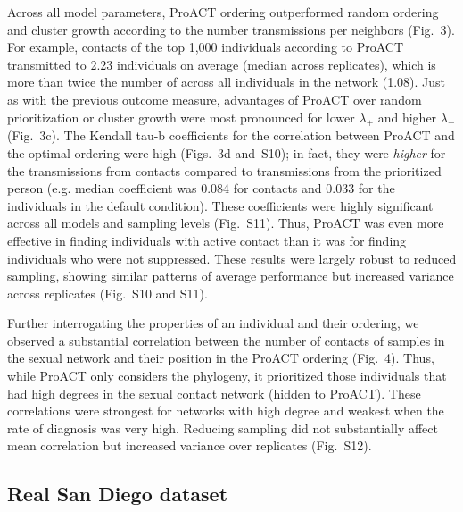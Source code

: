 \documentclass[a4paper,11pt]{article}
\newcommand{\PLWH}{sample\xspace}
\begin{document}
Across all model parameters, ProACT ordering outperformed random ordering and cluster growth according to the number transmissions per neighbors (Fig.~3).
For example, contacts of the top 1,000 individuals according to ProACT transmitted to 2.23 individuals on average (median across replicates), which is more than twice the number of across all individuals in the network (1.08).
Just as with the previous outcome measure, advantages of ProACT over random prioritization or cluster growth were most pronounced for lower $\lambda_{+}$ and higher $\lambda_{-}$ (Fig.~3c). 
The Kendall tau-b coefficients for the correlation between ProACT and the optimal ordering were high (Figs.~3d and~S10); in fact, they were \textit{higher} for the transmissions from contacts compared to transmissions from the prioritized person (e.g. median coefficient was 0.084 for contacts and 0.033 for the individuals in the default condition). 
These coefficients were highly significant across all models and sampling levels (Fig.~S11).
Thus, ProACT was even more effective in finding individuals with active contact than it was for finding individuals who were not suppressed. 
These results were largely robust to reduced sampling, showing similar patterns of average performance but increased variance across replicates (Fig.~S10 and S11).

Further interrogating the properties of an individual and their ordering, we observed a substantial correlation between the number of contacts of \PLWH{s} in the sexual network and their position in the ProACT ordering (Fig.~4). 
Thus, while ProACT only considers the phylogeny, it  prioritized those individuals that had high degrees in the sexual contact network (hidden to ProACT). 
These correlations were strongest for networks with high degree and weakest when the rate of diagnosis was very high. 
Reducing sampling did not substantially affect mean correlation but increased variance over replicates (Fig.~S12).





\subsection{Real San Diego dataset}

\end{document}
